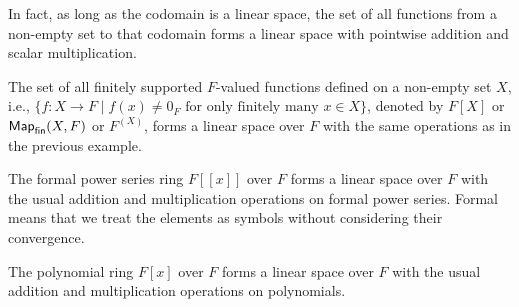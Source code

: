 \begin{remark}
  In fact, as long as the codomain is a linear space, the set of all functions from a non-empty set to that codomain forms a linear space with pointwise addition and scalar multiplication.
\end{remark}

\begin{example}
  The set of all finitely supported $F$-valued functions defined on a non-empty set $X$, i.e., $\{ f \colon X \to F \mid f(x) \neq 0_F \text{ for only finitely many } x \in X \}$, denoted by $F[X]$ or $\operatorname{\text{\normalfont\sffamily Map}}_{\operatorname{\text{\normalfont\sffamily fin}}}(X, F)$ or $F^{(X)}$, forms a linear space over $F$ with the same operations as in the previous example.
\end{example}

\begin{example}
  The formal power series ring $F[[x]]$ over $F$ forms a linear space over $F$ with the usual addition and multiplication operations on formal power series. Formal means that we treat the elements as symbols without considering their convergence.
\end{example}

\begin{example}
  The polynomial ring $F[x]$ over $F$ forms a linear space over $F$ with the usual addition and multiplication operations on polynomials.
\end{example}

